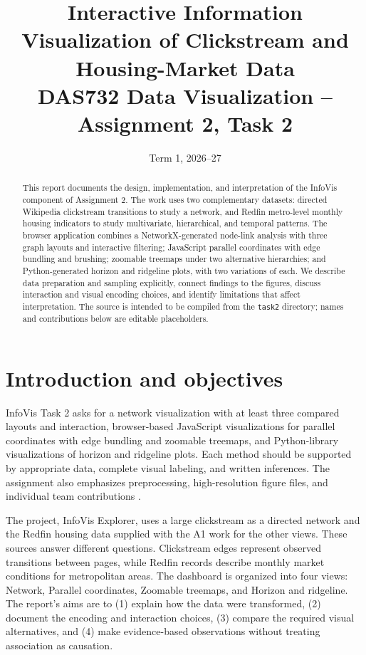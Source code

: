 \documentclass[11pt,letterpaper]{article}
\title{\textbf{Interactive Information Visualization of Clickstream and Housing-Market Data}\\[0.4em]
\large DAS732 Data Visualization -- Assignment 2, Task 2}
\author{\memberA \and \memberB \and \memberC}
\date{Term 1, 2026--27}
\newcommand{\project}{InfoVis Explorer}
\begin{document}
\maketitle
\begin{abstract}
This report documents the design, implementation, and interpretation of the InfoVis component of Assignment 2. The work uses two complementary datasets: directed Wikipedia clickstream transitions to study a network, and Redfin metro-level monthly housing indicators to study multivariate, hierarchical, and temporal patterns. The browser application combines a NetworkX-generated node-link analysis with three graph layouts and interactive filtering; JavaScript parallel coordinates with edge bundling and brushing; zoomable treemaps under two alternative hierarchies; and Python-generated horizon and ridgeline plots, with two variations of each. We describe data preparation and sampling explicitly, connect findings to the figures, discuss interaction and visual encoding choices, and identify limitations that affect interpretation. The source is intended to be compiled from the \texttt{task2} directory; names and contributions below are editable placeholders.
\end{abstract}

\tableofcontents
\newpage

\section{Introduction and objectives}
InfoVis Task 2 asks for a network visualization with at least three compared layouts and interaction, browser-based JavaScript visualizations for parallel coordinates with edge bundling and zoomable treemaps, and Python-library visualizations of horizon and ridgeline plots. Each method should be supported by appropriate data, complete visual labeling, and written inferences. The assignment also emphasizes preprocessing, high-resolution figure files, and individual team contributions \cite{assignment}.

The project, \project, uses a large clickstream as a directed network and the Redfin housing data supplied with the A1 work for the other views. These sources answer different questions. Clickstream edges represent observed transitions between pages, while Redfin records describe monthly market conditions for metropolitan areas. The dashboard is organized into four views: Network, Parallel coordinates, Zoomable treemaps, and Horizon and ridgeline. The report's aims are to (1) explain how the data were transformed, (2) document the encoding and interaction choices, (3) compare the required visual alternatives, and (4) make evidence-based observations without treating association as causation.
\end{document}
